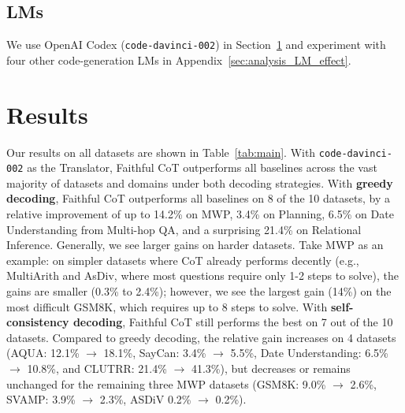 \documentclass[11pt]{article}
\begin{document}
\subsection{LMs} We use OpenAI Codex \cite{chen_evaluating_2021} (\texttt{code-davinci-002}) in Section~\ref{sec:results} and experiment with four other code-generation LMs in Appendix~\ref{sec:analysis_LM_effect}.

\section{Results}
\label{sec:results}




Our results on all datasets are shown in Table~\ref{tab:main}. With \texttt{code-davinci-002} as the Translator, Faithful CoT outperforms all baselines across the vast majority of datasets and domains under both decoding strategies. With \textbf{greedy decoding}, Faithful CoT outperforms all baselines on 8 of the 10 datasets, by a relative improvement of up to 14.2\% on MWP, 3.4\% on Planning, 6.5\% on Date Understanding from Multi-hop QA, and a surprising 21.4\% on Relational Inference. Generally, we see larger gains on harder datasets. Take MWP as an example: on simpler datasets where CoT already performs decently (e.g., MultiArith and AsDiv, where most questions require only 1-2 steps to solve), the gains are smaller (0.3\% to 2.4\%); however, we see the largest gain (14\%) on the most difficult GSM8K, which requires up to 8 steps to solve. With \textbf{self-consistency decoding}, Faithful CoT still performs the best on 7 out of the 10 datasets. Compared to greedy decoding, the relative gain increases on 4 datasets (AQUA: 12.1\% $\rightarrow$ 18.1\%, SayCan: 3.4\% $\rightarrow$ 5.5\%, Date Understanding: 6.5\% $\rightarrow$ 10.8\%, and CLUTRR: 21.4\% $\rightarrow$ 41.3\%), but decreases or remains unchanged for the remaining three MWP datasets (GSM8K: 9.0\% $\rightarrow$ 2.6\%, SVAMP: 3.9\% $\rightarrow$ 2.3\%, ASDiV 0.2\% $\rightarrow$ 0.2\%).
\end{document}
